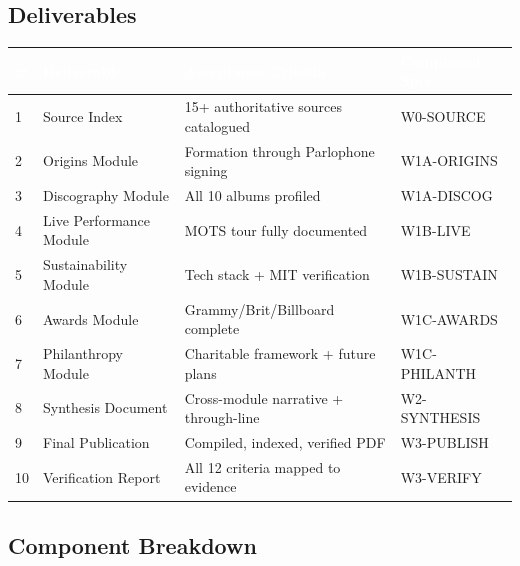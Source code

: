 \documentclass[11pt,letterpaper]{article}
\newcommand{\tableheader}[1]{\textbf{\sffamily\textcolor{white}{#1}}}
\begin{document}
\subsection{Deliverables}

\begin{center}
\begin{tabularx}{\textwidth}{C{0.5cm}L{3.5cm}X L{2.5cm}}
\toprule
{}
\tableheader{\#} & \tableheader{Deliverable} & \tableheader{Acceptance Criteria} & \tableheader{Component Spec} \\
 & Source Index & 15+ authoritative sources catalogued & W0-SOURCE \\
2 & Origins Module & Formation through Parlophone signing & W1A-ORIGINS \\
3 & Discography Module & All 10 albums profiled & W1A-DISCOG \\
4 & Live Performance Module & MOTS tour fully documented & W1B-LIVE \\
5 & Sustainability Module & Tech stack + MIT verification & W1B-SUSTAIN \\
6 & Awards Module & Grammy/Brit/Billboard complete & W1C-AWARDS \\
7 & Philanthropy Module & Charitable framework + future plans & W1C-PHILANTH \\
8 & Synthesis Document & Cross-module narrative + through-line & W2-SYNTHESIS \\
9 & Final Publication & Compiled, indexed, verified PDF & W3-PUBLISH \\
10 & Verification Report & All 12 criteria mapped to evidence & W3-VERIFY \\
\bottomrule
\end{tabularx}
\end{center}

\subsection{Component Breakdown}
\end{document}
